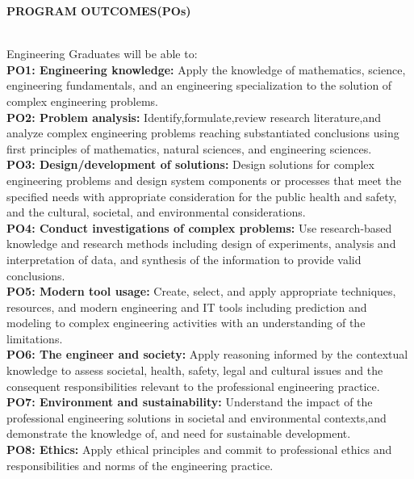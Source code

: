 \newcommand{\normal}{\fontsize{12pt}{16pt}\selectfont}
\newcommand{\size}{\fontsize{14pt}{18pt}\selectfont}
\newcommand{\bigsize}{\fontsize{16pt}{20pt}\selectfont}
\newcommand{\bigbigsize}{\fontsize{20pt}{24pt}\selectfont}
\begin{flushleft}
\size\textbf{PROGRAM OUTCOMES(POs)}
\end{flushleft}
\\
Engineering Graduates will be able to:
\vspace{5mm}\\
\textbf{PO1: Engineering knowledge:} Apply the knowledge of mathematics, science, engineering fundamentals, and an engineering specialization to the solution of complex engineering problems.\\
\textbf{PO2: Problem analysis:} Identify,formulate,review 
 research literature,and analyze complex engineering problems reaching substantiated conclusions using first principles of mathematics, natural sciences, and engineering sciences.\\
\textbf{PO3: Design/development of solutions:} Design solutions for complex engineering problems and design system components or processes that meet the specified needs with appropriate consideration for the public health and safety, and the cultural, societal, and environmental considerations.\\
\textbf{PO4: Conduct investigations of complex problems:} 
 Use research-based knowledge and research methods including design of experiments, analysis and interpretation of data, and synthesis of the information to provide valid conclusions.\\
\textbf{PO5: Modern tool usage:} Create, select, and apply appropriate techniques, resources, and modern engineering and IT tools including prediction and modeling to complex engineering activities with an understanding of the limitations.\\
\textbf{PO6: The engineer and society:} Apply reasoning informed by the contextual knowledge to assess societal, health, safety, legal and cultural issues and the consequent responsibilities relevant to the professional engineering practice.\\
\textbf{PO7: Environment and sustainability:} Understand the impact of the professional engineering solutions in societal and environmental contexts,and demonstrate the knowledge of, and need for sustainable development.\\
\textbf{PO8: Ethics:} Apply ethical principles and commit to professional ethics and responsibilities and norms of the engineering practice.\\
